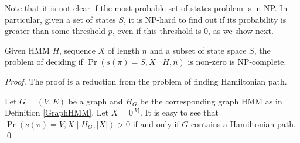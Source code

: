 
Note that it is not clear if the most probable set of states problem is in
NP. In particular, given a set of states $S$, it is NP-hard to find out if its
probability is greater than some threshold $p$, even if this threshold
is 0, as we show next.

\begin{theorem}
Given HMM $H$, sequence $X$ of length $n$ 
and a subset of state space $S$, the problem of deciding if
$\Pr\left(s(\pi)=S, X\mid H, n\right)$ is non-zero is NP-complete.
\end{theorem}

\begin{proof} The proof is a reduction from the problem of finding Hamiltonian path.

%

Let $G=(V,E)$ be a graph  
and $H_G$ be the corresponding graph HMM as
in Definition \ref{GraphHMM}. Let $X=0^{|V|}$.  
It is easy to see that $\Pr\left(s(\pi)=V,X \mid H_G, |X|
\right)>0$ if and only if $G$ contains a Hamiltonian path. \qed
\end{proof}

